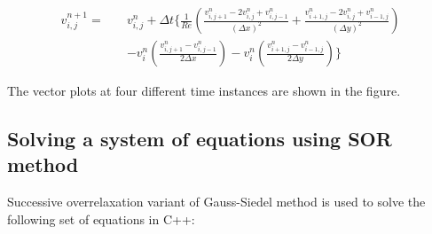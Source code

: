 \documentclass[12pt,a4paper,fleqn]{article}
\begin{document}
\begin{equation}
\begin{split}
v_{i,j}^{n+1}=\quad &v_{i,j}^n + \Delta t
\bigg\{\frac{1}{Re}\left(\frac{v_{i,j+1}^n - 2v_{i,j}^n + v_{i,j-1}^n}{(\Delta
x)^2} + \frac{v_{i+1,j}^n - 2v_{i,j}^n + v_{i-1,j}^n}{(\Delta y)^2}\right)
\\&- v_i^n\left(\frac{v_{i,j+1}^n - v_{i,j-1}^n}{2\Delta x}\right) -
v_i^n\left(\frac{v_{i+1,j}^n - v_{i-1,j}^n}{2\Delta y} \right) \bigg\}
\end{split}
\end{equation}

The vector plots at four different time instances are shown in the figure.


\newpage

\subsection*{Solving a system of equations using SOR method}

Successive overrelaxation variant of Gauss-Siedel method is used to solve the
following set of equations in C++:
\end{document}

